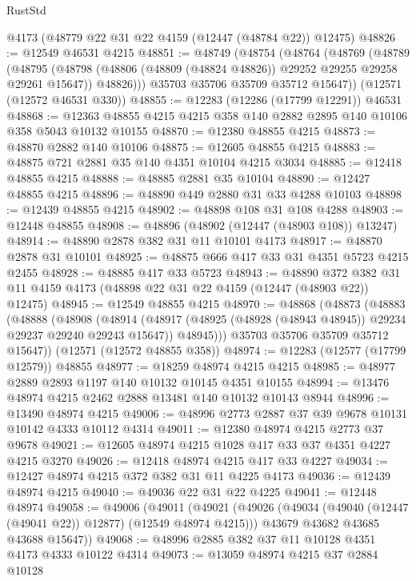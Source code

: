 \begin{lexlean}{RustStd}
\begin{coremodule}
    @4173
    (@48779 @22 @31 @22 @4159 (@12447 (@48784 @22)) @12475)
@48826 := @12549 @46531 @4215
@48851 := @48749
    (@48754
      (@48764
        (@48769
          (@48789
            (@48795
              (@48798 (@48806 (@48809 (@48824 @48826)) @29252 @29255 @29258 @29261 @15647))
              @48826)))
        @35703
        @35706
        @35709
        @35712
        @15647))
    (@12571 (@12572 @46531 @330))
@48855 := @12283 (@12286 (@17799 @12291)) @46531
@48868 := @12363 @48855 @4215 @4215 @358 @140 @2882 @2895 @140 @10106 @358 @5043 @10132 @10155
@48870 := @12380 @48855 @4215
@48873 := @48870 @2882 @140 @10106
@48875 := @12605 @48855 @4215
@48883 := @48875 @721 @2881 @35 @140 @4351 @10104 @4215 @3034
@48885 := @12418 @48855 @4215
@48888 := @48885 @2881 @35 @10104
@48890 := @12427 @48855 @4215
@48896 := @48890 @449 @2880 @31 @33 @4288 @10103
@48898 := @12439 @48855 @4215
@48902 := @48898 @108 @31 @108 @4288
@48903 := @12448 @48855
@48908 := @48896 (@48902 (@12447 (@48903 @108)) @13247)
@48914 := @48890 @2878 @382 @31 @11 @10101 @4173
@48917 := @48870 @2878 @31 @10101
@48925 := @48875 @666 @417 @33 @31 @4351 @5723 @4215 @2455
@48928 := @48885 @417 @33 @5723
@48943 := @48890
    @372
    @382
    @31
    @11
    @4159
    @4173
    (@48898 @22 @31 @22 @4159 (@12447 (@48903 @22)) @12475)
@48945 := @12549 @48855 @4215
@48970 := @48868
    (@48873
      (@48883
        (@48888
          (@48908
            (@48914
              (@48917 (@48925 (@48928 (@48943 @48945)) @29234 @29237 @29240 @29243 @15647))
              @48945)))
        @35703
        @35706
        @35709
        @35712
        @15647))
    (@12571 (@12572 @48855 @358))
@48974 := @12283 (@12577 (@17799 @12579)) @48855
@48977 := @18259 @48974 @4215 @4215
@48985 := @48977 @2889 @2893 @1197 @140 @10132 @10145 @4351 @10155
@48994 := @13476 @48974 @4215 @2462 @2888 @13481 @140 @10132 @10143 @8944
@48996 := @13490 @48974 @4215
@49006 := @48996 @2773 @2887 @37 @39 @9678 @10131 @10142 @4333 @10112 @4314
@49011 := @12380 @48974 @4215 @2773 @37 @9678
@49021 := @12605 @48974 @4215 @1028 @417 @33 @37 @4351 @4227 @4215 @3270
@49026 := @12418 @48974 @4215 @417 @33 @4227
@49034 := @12427 @48974 @4215 @372 @382 @31 @11 @4225 @4173
@49036 := @12439 @48974 @4215
@49040 := @49036 @22 @31 @22 @4225
@49041 := @12448 @48974
@49058 := @49006
    (@49011
      (@49021
        (@49026 (@49034 (@49040 (@12447 (@49041 @22)) @12877) (@12549 @48974 @4215)))
        @43679
        @43682
        @43685
        @43688
        @15647))
@49068 := @48996 @2885 @382 @37 @11 @10128 @4351 @4173 @4333 @10122 @4314
@49073 := @13059 @48974 @4215 @37 @2884 @10128

\end{coremodule}
\end{lexlean}
